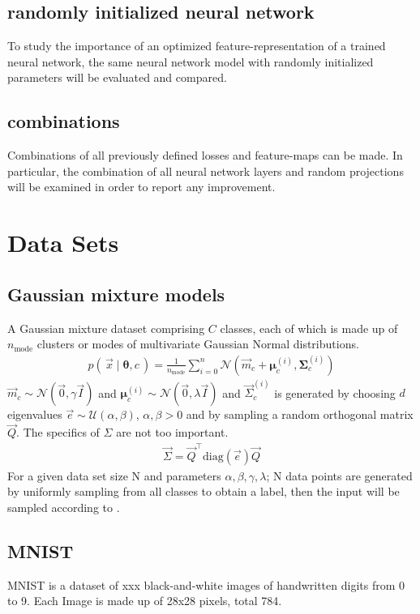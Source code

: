 \subsection{randomly initialized neural network}
To study the importance of an optimized feature-representation of a trained neural network, 
the same neural network model with randomly initialized parameters will be evaluated and compared.

\subsection{combinations}
Combinations of all previously defined losses and feature-maps can be made. In particular, the combination of all neural network layers and random projections will be examined in order to report any improvement.


\section{Data Sets}
\subsection{Gaussian mixture models}
A Gaussian mixture dataset comprising $C$ classes, each of which is made up of $n_\text{mode}$ clusters or modes of multivariate Gaussian Normal distributions.
\begin{align}
\label{eqn:gmmdistr}
    p(\, \vec x \mid \boldsymbol \theta, c \,) = \frac 1 {n_\text{mode}} \sum _{i=0}^n
    \mathcal N (\vec m_c + \boldsymbol \mu_c^{(i)}, \boldsymbol \Sigma_c^{(i)})
\end{align}
$\vec m_c \sim \mathcal N (\vec 0, \gamma \vec I)$ and
$\boldsymbol \mu_c^{(i)} \sim \mathcal N (\vec 0, \lambda \vec I)$ and
$\vec \Sigma_c^{(i)}$ is generated by choosing $d$ eigenvalues $\vec e \sim \mathcal U(\alpha, \beta)$, $\alpha, \beta > 0$ and 
by sampling a random orthogonal matrix $\vec Q$. The specifics of $\Sigma$ are not too important.
\begin{align*}
    \vec \Sigma = \vec Q^\top \text{diag}(\vec e) \vec Q
\end{align*}
For a given data set size N and parameters $\alpha, \beta, \gamma, \lambda$; N data points are generated by uniformly sampling from all classes to obtain a label, then the input will be sampled according to .

\subsection{MNIST}
MNIST is a dataset of xxx black-and-white images of handwritten digits from 0 to 9. 
Each Image is made up of 28x28 pixels, total 784.

